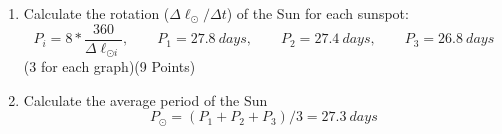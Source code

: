 \begin{enumerate}
\item Calculate the rotation ($\Delta\ell_\odot/\Delta t$) of the Sun for each
  sunspot:
  \[
  P_i = 8 * \frac{360}{\Delta\ell_{\odot i}}, \qquad
  P_1 = 27.8~days, \qquad
  P_2 = 27.4~days, \qquad
  P_3 = 26.8~days
  \]
  \hfill(3 for each graph)\quad(9 Points)
\item Calculate the average period of the Sun
  \begin{equation*}
  P_\odot = (P_1 + P_2 + P_3)/3 = 27.3~days \tag*{(1.5 Point)}
  \end{equation*}
\end{enumerate}
